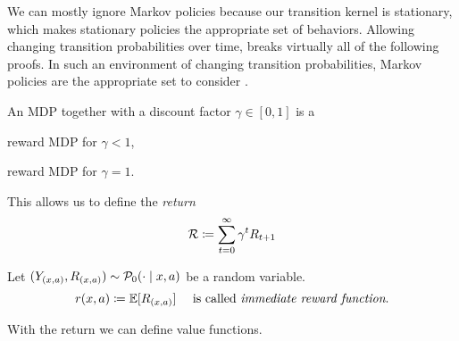 We can mostly ignore Markov policies because our transition kernel is stationary, which makes stationary policies the appropriate set of behaviors. Allowing changing transition probabilities over time, breaks virtually all of the following proofs. In such an environment of changing transition probabilities, Markov policies are the appropriate set to consider \parencite[c.f.][]{putermanMarkovDecisionProcesses2005}.

\begin{definition}
An MDP together with a discount factor \(\gamma\in[0,1]\) is a
\begin{description}[font=\normalfont, nosep]
	\item[\emph{discounted}] reward MDP for \(\gamma <1 \),
	\item[\emph{undiscounted}] reward MDP for \(\gamma=1 \).
\end{description}
This allows us to define the \emph{return}
\[\mathcal{R}\coloneqq\sum_{t=0}^{\infty}\gamma^t R_{t+1}\]
\end{definition}

\begin{definition}
Let \((Y_{(x,a)}, R_{(x,a)})\sim \mathcal{P}_0(\cdot\mid x,a) \) be a random variable.
\[r(x,a)\coloneqq \mathbb{E}[R_{(x,a)}] \quad\text{ is called \emph{immediate reward function}.}\]
\end{definition}

With the return we can define value functions.

